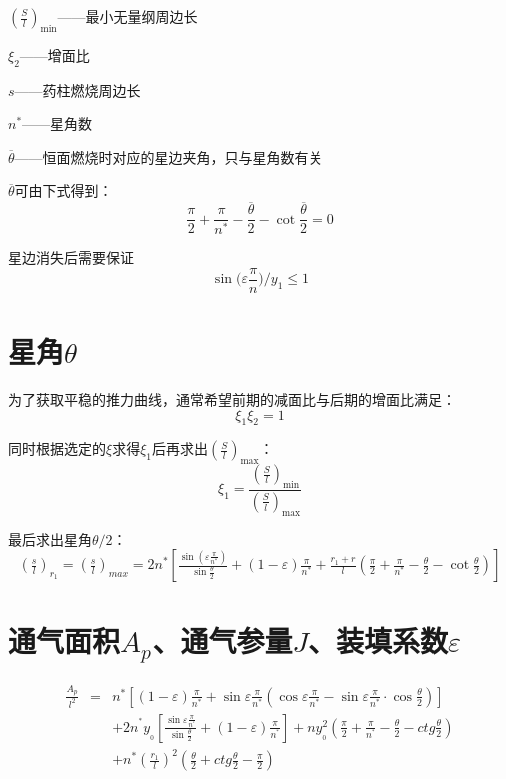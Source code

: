 ${\left( \frac{S}{l} \right) _{\min}}$——最小无量纲周边长

\vspace{0.8em}
$\xi _2$——增面比

$s$——药柱燃烧周边长

$n^*$——星角数

$\overline{\theta}$——恒面燃烧时对应的星边夹角，只与星角数有关

$\overline{\theta}$可由下式得到：
\[
\frac{\pi}{2}+\frac{\pi}{n^*}-\frac{\overline{\theta }}{2}-\cot \frac{\overline{\theta }}{2}=0
\]

星边消失后需要保证
\[
\sin\mathrm{(}\varepsilon \frac{\pi}{n})/y_1\leqslant 1
\]

\section{星角\texorpdfstring{$\theta$}{}}

为了获取平稳的推力曲线，通常希望前期的减面比与后期的增面比满足：
\[
\xi _1\xi _2=1
\]

同时根据选定的$\xi$求得$\xi_{1}$后再求出$\left( \frac{S}{l} \right) _{\max}$：
\[
\xi _1=\frac{\left( \frac{S}{l} \right) _{\min}}{\left( \frac{S}{l} \right) _{\max}}
\]

最后求出星角$\theta /2$：
\begingroup
\fontsize{16}{14}\selectfont 
\[
\left( \tfrac{s}{l} \right) _{r_1}=\left( \tfrac{s}{l} \right) _{max}=2n^*\left[ \tfrac{\sin \left( \varepsilon \frac{\pi}{n^*} \right)}{\sin \frac{\theta}{2}}+\left( 1-\varepsilon \right) \tfrac{\pi}{n^*}+\tfrac{r_1+r}{l}\left( \tfrac{\pi}{2}+\tfrac{\pi}{n^*}-\tfrac{\theta}{2}-\cot\tfrac{\theta}{2} \right) \right] 
\]
\endgroup
\section{通气面积$A_{p}$、通气参量$J$、装填系数\texorpdfstring{$\varepsilon$}{}}

\begingroup
\fontsize{16}{14}\selectfont 

\[
  \begin{array}{ccl}
    \frac{A_p}{l^2}&		=&		n^*\left[ \left( 1-\varepsilon \right) \frac{\pi}{n^*}+\sin \varepsilon \frac{\pi}{n^*}\left( \cos \varepsilon \frac{\pi}{n^*}-\sin \varepsilon \frac{\pi}{n^*}\cdot \cos \frac{\theta}{2} \right) \right]\\[1em]
    &		&		+2n^{^*}y_{_0}\left[ \frac{\sin \varepsilon \frac{\pi}{n^{^*}}}{\sin \frac{\theta}{2}}+(1-\varepsilon )\frac{\pi}{n^{^*}} \right] +ny_{_0}^{2}\left( \frac{\pi}{2}+\frac{\pi}{n^{^*}}-\frac{\theta}{2}-ctg\frac{\theta}{2} \right)\\[1em]
    &		&		+n^*\left( \frac{r_1}{l} \right) ^2\left( \frac{\theta}{2}+ctg\frac{\theta}{2}-\frac{\pi}{2} \right)\\
  \end{array}
  \]

